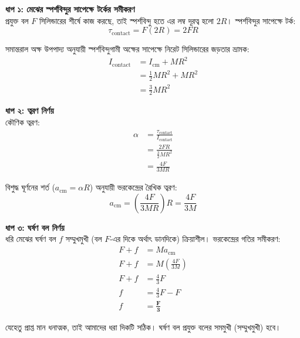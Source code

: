 \documentclass[12pt, a4paper]{article}
\begin{document}
\begin{tcolorbox}[solutionbox={সমাধান (Solution)}]
    \noindent
    \textbf{ধাপ ১: মেঝের স্পর্শবিন্দুর সাপেক্ষে টর্কের সমীকরণ} \\
    প্রযুক্ত বল $F$ সিলিন্ডারের শীর্ষে কাজ করছে, তাই স্পর্শবিন্দু হতে এর লম্ব দূরত্ব হলো $2R$। স্পর্শবিন্দুর সাপেক্ষে টর্ক:
    \[ \tau_{\text{contact}} = F (2R) = 2 F R \]
    
    সমান্তরাল অক্ষ উপপাদ্য অনুযায়ী স্পর্শবিন্দুগামী অক্ষের সাপেক্ষে নিরেট সিলিন্ডারের জড়তার ভ্রামক:
    \begin{align*}
        I_{\text{contact}} &= I_{\text{cm}} + M R^2 \\
        &= \frac{1}{2} M R^2 + M R^2 \\
        &= \frac{3}{2} M R^2
    \end{align*}
    
    \vspace{0.5em}
    \noindent\textbf{ধাপ ২: ত্বরণ নির্ণয়} \\
    কৌণিক ত্বরণ:
    \begin{align*}
        \alpha &= \frac{\tau_{\text{contact}}}{I_{\text{contact}}} \\
        &= \frac{2 F R}{\frac{3}{2} M R^2} \\
        &= \frac{4 F}{3 M R}
    \end{align*}
    
    বিশুদ্ধ ঘূর্ণনের শর্ত ($a_{\text{cm}} = \alpha R$) অনুযায়ী ভরকেন্দ্রের রৈখিক ত্বরণ:
    \[ a_{\text{cm}} = \left( \frac{4 F}{3 M R} \right) R = \frac{4 F}{3 M} \]
    
    \vspace{0.5em}
    \noindent\textbf{ধাপ ৩: ঘর্ষণ বল নির্ণয়} \\
    ধরি মেঝের ঘর্ষণ বল $f$ সম্মুখমুখী (বল $F$-এর দিকে অর্থাৎ ডানদিকে) ক্রিয়াশীল। ভরকেন্দ্রের গতির সমীকরণ:
    \begin{align*}
        F + f &= M a_{\text{cm}} \\
        F + f &= M \left(\frac{4 F}{3 M}\right) \\
        F + f &= \frac{4}{3} F \\
        f &= \frac{4}{3} F - F \\
        f &= \mathbf{\frac{F}{3}}
    \end{align*}
    
    যেহেতু প্রাপ্ত মান ধনাত্মক, তাই আমাদের ধরা দিকটি সঠিক। ঘর্ষণ বল প্রযুক্ত বলের সমমুখী (সম্মুখমুখী) হবে।
\end{tcolorbox}
\end{document}
